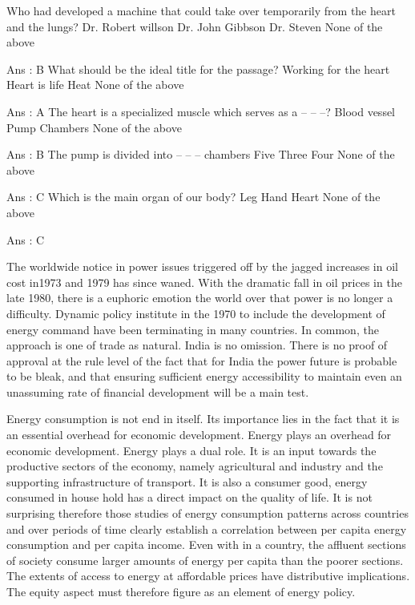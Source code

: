     Who had developed a machine that could take over temporarily from the heart and the lungs?
        Dr. Robert willson
        Dr. John Gibbson
        Dr. Steven
        None of the above 

    Ans : B
    What should be the ideal title for the passage?
        Working for the heart
        Heart is life
        Heat
        None of the above 

    Ans : A
    The heart is a specialized muscle which serves as a -- -- --?
        Blood vessel
        Pump
        Chambers
        None of the above 

    Ans : B
    The pump is divided into -- -- -- chambers
        Five
        Three
        Four
        None of the above

    Ans : C
    Which is the main organ of our body?
        Leg
        Hand
        Heart
        None of the above 

    Ans : C 


The worldwide notice in power issues triggered off by the jagged increases in oil cost in1973 and 1979 has since waned. With the dramatic fall in oil prices in the late 1980, there is a euphoric emotion the world over that power is no longer a difficulty. Dynamic policy institute in the 1970 to include the development of energy command have been terminating in many countries. In common, the approach is one of trade as natural. India is no omission. There is no proof of approval at the rule level of the fact that for India the power future is probable to be bleak, and that ensuring sufficient energy accessibility to maintain even an unassuming rate of financial development will be a main test.

Energy consumption is not end in itself. Its importance lies in the fact that it is an essential overhead for economic development. Energy plays an overhead for economic development. Energy plays a dual role. It is an input towards the productive sectors of the economy, namely agricultural and industry and the supporting infrastructure of transport. It is also a consumer good, energy consumed in house hold has a direct impact on the quality of life. It is not surprising therefore those studies of energy consumption patterns across countries and over periods of time clearly establish a correlation between per capita energy consumption and per capita income. Even with in a country, the affluent sections of society consume larger amounts of energy per capita than the poorer sections. The extents of access to energy at affordable prices have distributive implications. The equity aspect must therefore figure as an element of energy policy.

